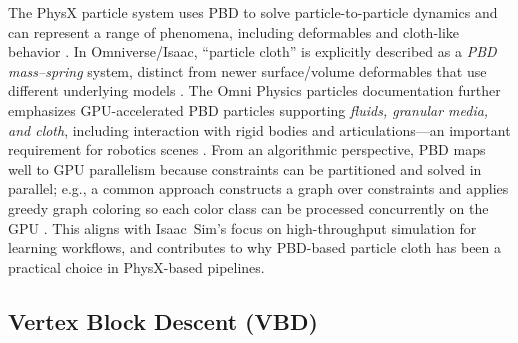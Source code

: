 The PhysX particle system uses \ac{PBD} to solve particle-to-particle dynamics and can represent
a range of phenomena, including deformables and cloth-like behavior \cite{physx_pbd_particlesystem_510,physx_particlesystem_513}.
In Omniverse/Isaac, ``particle cloth'' is explicitly described as a \emph{\ac{PBD} mass--spring}
system, distinct from newer surface/volume deformables that use different underlying models
\cite{omni_deformable_migration_guide}. The Omni Physics particles documentation further
emphasizes \ac{GPU}-accelerated \ac{PBD} particles supporting \emph{fluids, granular media, and
cloth}, including interaction with rigid bodies and articulations—an important requirement
for robotics scenes \cite{omni_physics_particles}.
From an algorithmic perspective, \ac{PBD} maps well to \ac{GPU} parallelism because constraints
can be partitioned and solved in parallel; e.g., a common approach constructs a graph over
constraints and applies greedy graph coloring so each color class can be processed
concurrently on the \ac{GPU} \cite{fratarcangeli2013gpu_pbd}. This aligns with Isaac~Sim's focus
on high-throughput simulation for learning workflows, and contributes to why \ac{PBD}-based
particle cloth has been a practical choice in PhysX-based pipelines.

\subsection{Vertex Block Descent (VBD)} %

